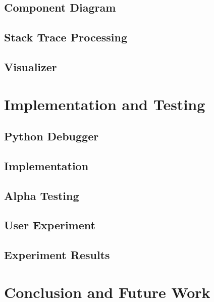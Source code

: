 \documentclass[conference]{IEEEtran}
\begin{document}
\subsection{Component Diagram}
\subsection{Stack Trace Processing}
\subsection{Visualizer}

\section{Implementation and Testing}
\subsection{Python Debugger}
\subsection{Implementation}
\subsection{Alpha Testing}
\subsection{User Experiment}
\subsection{Experiment Results}

\section{Conclusion and Future Work}




\vspace{12pt}
\end{document}
